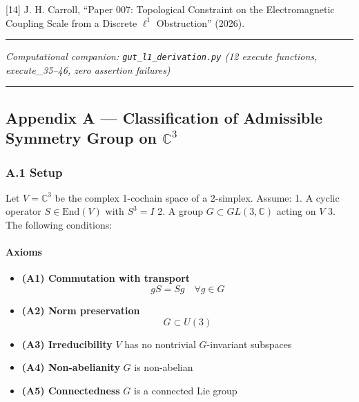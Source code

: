 \documentclass[
]{article}
\providecommand{\tightlist}{%
  \setlength{\itemsep}{0pt}\setlength{\parskip}{0pt}}
\begin{document}
{[}14{]} J. H. Carroll, ``Paper 007: Topological Constraint on the
Electromagnetic Coupling Scale from a Discrete \(\ell^1\) Obstruction''
(2026).

\begin{center}\rule{0.5\linewidth}{0.5pt}\end{center}

\emph{Computational companion: \texttt{gut\_l1\_derivation.py} (12
execute functions, execute\_35--46, zero assertion failures)}

\begin{center}\rule{0.5\linewidth}{0.5pt}\end{center}

\hypertarget{appendix-a-classification-of-admissible-symmetry-group-on-mathbbc3}{%
\subsection{\texorpdfstring{Appendix A --- Classification of Admissible
Symmetry Group on
\(\mathbb{C}^3\)}{Appendix A --- Classification of Admissible Symmetry Group on \textbackslash mathbb\{C\}\^{}3}}\label{appendix-a-classification-of-admissible-symmetry-group-on-mathbbc3}}

\hypertarget{a.1-setup}{%
\subsubsection{A.1 Setup}\label{a.1-setup}}

Let \(V = \mathbb{C}^3\) be the complex 1-cochain space of a 2-simplex.
Assume: 1. A cyclic operator \(S \in \mathrm{End}(V)\) with \(S^3 = I\)
2. A group \(G \subset GL(3,\mathbb{C})\) acting on \(V\) 3. The
following conditions:

\hypertarget{axioms}{%
\paragraph{Axioms}\label{axioms}}

\begin{itemize}
\tightlist
\item
  \textbf{(A1) Commutation with transport}
  \[gS = Sg \quad \forall g \in G\]
\item
  \textbf{(A2) Norm preservation} \[G \subset U(3)\]
\item
  \textbf{(A3) Irreducibility} \(V\) has no nontrivial \(G\)-invariant
  subspaces
\item
  \textbf{(A4) Non-abelianity} \(G\) is non-abelian
\item
  \textbf{(A5) Connectedness} \(G\) is a connected Lie group
\end{itemize}
\end{document}
